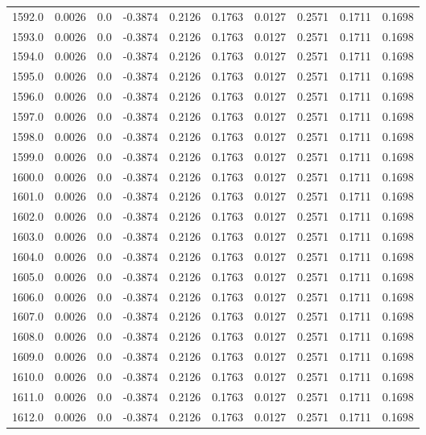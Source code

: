 \begin{longtable}{lrrrrrrrrr}
1592.0 & 0.0026 & 0.0 & -0.3874 & 0.2126 & 0.1763 & 0.0127 & 0.2571 & 0.1711 & 0.1698 \\
1593.0 & 0.0026 & 0.0 & -0.3874 & 0.2126 & 0.1763 & 0.0127 & 0.2571 & 0.1711 & 0.1698 \\
1594.0 & 0.0026 & 0.0 & -0.3874 & 0.2126 & 0.1763 & 0.0127 & 0.2571 & 0.1711 & 0.1698 \\
1595.0 & 0.0026 & 0.0 & -0.3874 & 0.2126 & 0.1763 & 0.0127 & 0.2571 & 0.1711 & 0.1698 \\
1596.0 & 0.0026 & 0.0 & -0.3874 & 0.2126 & 0.1763 & 0.0127 & 0.2571 & 0.1711 & 0.1698 \\
1597.0 & 0.0026 & 0.0 & -0.3874 & 0.2126 & 0.1763 & 0.0127 & 0.2571 & 0.1711 & 0.1698 \\
1598.0 & 0.0026 & 0.0 & -0.3874 & 0.2126 & 0.1763 & 0.0127 & 0.2571 & 0.1711 & 0.1698 \\
1599.0 & 0.0026 & 0.0 & -0.3874 & 0.2126 & 0.1763 & 0.0127 & 0.2571 & 0.1711 & 0.1698 \\
1600.0 & 0.0026 & 0.0 & -0.3874 & 0.2126 & 0.1763 & 0.0127 & 0.2571 & 0.1711 & 0.1698 \\
1601.0 & 0.0026 & 0.0 & -0.3874 & 0.2126 & 0.1763 & 0.0127 & 0.2571 & 0.1711 & 0.1698 \\
1602.0 & 0.0026 & 0.0 & -0.3874 & 0.2126 & 0.1763 & 0.0127 & 0.2571 & 0.1711 & 0.1698 \\
1603.0 & 0.0026 & 0.0 & -0.3874 & 0.2126 & 0.1763 & 0.0127 & 0.2571 & 0.1711 & 0.1698 \\
1604.0 & 0.0026 & 0.0 & -0.3874 & 0.2126 & 0.1763 & 0.0127 & 0.2571 & 0.1711 & 0.1698 \\
1605.0 & 0.0026 & 0.0 & -0.3874 & 0.2126 & 0.1763 & 0.0127 & 0.2571 & 0.1711 & 0.1698 \\
1606.0 & 0.0026 & 0.0 & -0.3874 & 0.2126 & 0.1763 & 0.0127 & 0.2571 & 0.1711 & 0.1698 \\
1607.0 & 0.0026 & 0.0 & -0.3874 & 0.2126 & 0.1763 & 0.0127 & 0.2571 & 0.1711 & 0.1698 \\
1608.0 & 0.0026 & 0.0 & -0.3874 & 0.2126 & 0.1763 & 0.0127 & 0.2571 & 0.1711 & 0.1698 \\
1609.0 & 0.0026 & 0.0 & -0.3874 & 0.2126 & 0.1763 & 0.0127 & 0.2571 & 0.1711 & 0.1698 \\
1610.0 & 0.0026 & 0.0 & -0.3874 & 0.2126 & 0.1763 & 0.0127 & 0.2571 & 0.1711 & 0.1698 \\
1611.0 & 0.0026 & 0.0 & -0.3874 & 0.2126 & 0.1763 & 0.0127 & 0.2571 & 0.1711 & 0.1698 \\
1612.0 & 0.0026 & 0.0 & -0.3874 & 0.2126 & 0.1763 & 0.0127 & 0.2571 & 0.1711 & 0.1698 \\

\end{longtable}

